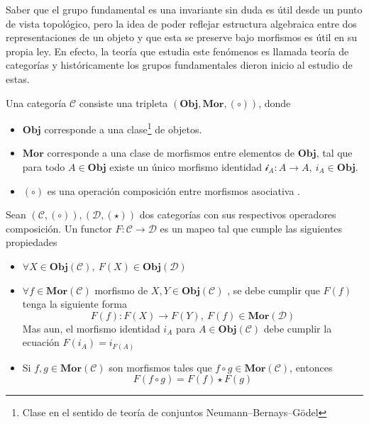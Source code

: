{Saber que el grupo fundamental es una invariante sin duda es útil
desde un punto de vista topológico, pero la idea de poder reflejar
estructura algebraica entre dos representaciones de un objeto y que esta
se preserve bajo morfismos es útil en su propia ley. En efecto, la
teoría que estudia este fenómenos es llamada teoría de categorías y
históricamente los grupos fundamentales dieron inicio al estudio de
estas.
\begin{definicion}
  Una categoría \(\mathcal C\) consiste una tripleta \(( \mathbf {Obj},
  \mathbf {Mor}, (\circ))\), donde
  \begin{itemize}
    \item \(\mathbf {Obj}\) corresponde a una clase\footnote{Clase en el
      sentido de teoría de conjuntos Neumann–Bernays–Gödel} de objetos.
    \item \(\mathbf {Mor}\) corresponde a una clase de morfismos entre
      elementos de \(\mathbf {Obj}\), tal que para todo \(A \in
      \mathbf {Obj}\) existe un único morfismo identidad \( \mathcal i
      _A : A \to A, \ i_A \in \mathbf{Obj}\).
    \item \((\circ)\) es una operación composición entre morfismos
      asociativa .
  \end{itemize}
\end{definicion}
\begin{definicion}
  Sean \(\left( \mathscr{C} , (\circ) \right), \left(\mathscr D ,
  (\star) \right) \) dos categorías con sus respectivos operadores
  composición. Un functor \(F : \mathscr C \to \mathscr D\) es un mapeo
  tal que cumple las siguientes propiedades
  \begin{itemize}
  \item \(\forall X \in \mathbf{Obj}(\mathscr C),\ F(X) \in \mathbf{Obj} (\mathscr D)\)
  \item \(\forall f \in \mathbf{Mor} (\mathcal C)\) morfismo de \(X,Y
    \in \mathbf{Obj} (\mathcal C)\) , se
    debe cumplir que \(F (f)\) tenga la siguiente forma
    \[ F(f) : F(X) \to F(Y),\ F(f) \in \mathbf{Mor}
      (\mathcal D) \]
    Mas aun, el morfismo identidad \(i_A\) para \(A \in
    \mathbf{Obj} (\mathcal C)\) debe cumplir la ecuación \(F (i_A) =
    i_{F(A)}\)
  \item Si \(f,g \in \mathbf{Mor}(\mathcal C)\) son morfismos tales que
    \(f \circ g \in \mathbf{Mor} (\mathcal C)\), entonces
    \[ F(f \circ g) = F(f) \star F(g) \]
  \end{itemize}
\end{definicion}
}
